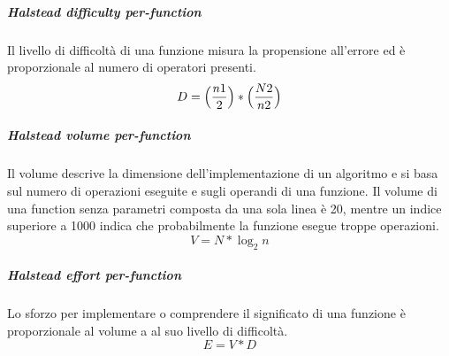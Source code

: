 			\subparagraph{Halstead difficulty per-function}
			Il livello di difficoltà di una funzione misura la propensione all'errore ed è proporzionale al numero di operatori presenti. 
			\[
			 D = \Bigl( \dfrac{n1}{2} \Bigr)  * \Bigl(  \dfrac{N2}{n2} \Bigr)
			 \]

			
			\subparagraph{Halstead volume per-function}
			Il volume descrive la dimensione dell'implementazione di un algoritmo e si basa sul numero di operazioni eseguite e sugli operandi di una funzione. Il volume di una function senza parametri composta da una sola linea è 20, mentre un indice superiore a 1000 indica che probabilmente la funzione esegue troppe operazioni.
			\[
			 V = N * \log_{2}n
			\]

			
			\subparagraph{Halstead effort per-function}
			Lo sforzo per implementare o comprendere il significato di una funzione è proporzionale al volume a al suo livello di difficoltà.
			 \[
			 E = V * D
			\]

			
			
			
			

